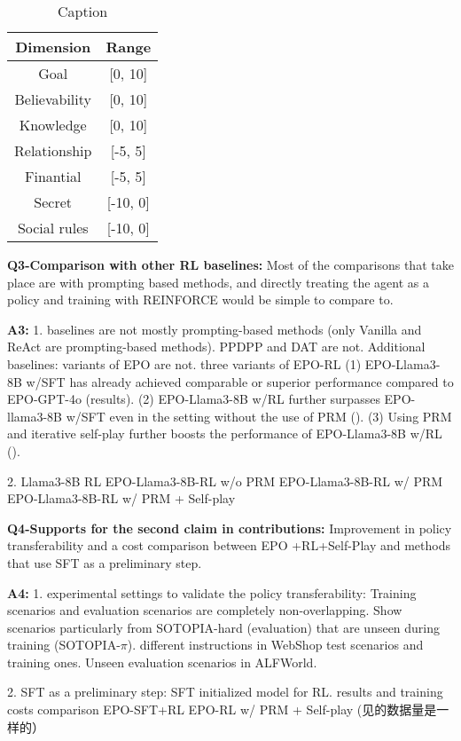 \begin{table*}[h]
    \centering
    \begin{tabular}{c|c}
    \toprule
      Dimension   &  Range \\
      \midrule
      Goal   & [0, 10]\\
      Believability & [0, 10]\\
      Knowledge & [0, 10]\\
      Relationship & [-5, 5] \\
      Finantial & [-5, 5]\\
      Secret & [-10, 0]\\
      Social rules & [-10, 0]\\
      \bottomrule
    \end{tabular}
    \caption{Caption}
    \label{tab:my_label}
\end{table*}



\textbf{Q3-Comparison with other RL baselines:} Most of the comparisons that take place are with prompting based methods, and directly treating the agent as a policy and training with REINFORCE would be simple to compare to.

\textbf{A3:}
1. baselines are not mostly prompting-based methods (only Vanilla and ReAct are prompting-based methods).
PPDPP and DAT are not.
Additional baselines: variants of EPO are not. three variants of EPO-RL
(1) EPO-Llama3-8B w/SFT has already achieved comparable or superior performance compared to EPO-GPT-4o (results). 
(2) EPO-Llama3-8B w/RL further surpasses EPO-llama3-8B w/SFT even in the setting without the use of PRM ().
(3) Using PRM and iterative self-play further boosts the performance of EPO-Llama3-8B w/RL ().

2. Llama3-8B RL 
EPO-Llama3-8B-RL w/o PRM
EPO-Llama3-8B-RL w/ PRM
EPO-Llama3-8B-RL w/ PRM + Self-play


\textbf{Q4-Supports for the second claim in contributions:}  Improvement in policy transferability and a cost comparison between EPO +RL+Self-Play and methods that use SFT as a preliminary step.

\textbf{A4:}
1. experimental settings to validate the policy transferability: Training scenarios and evaluation scenarios are completely non-overlapping. Show scenarios particularly from SOTOPIA-hard (evaluation) that are unseen during training (SOTOPIA-$\pi$).
different instructions in WebShop test scenarios and training ones.
Unseen evaluation scenarios in ALFWorld. 

2.  SFT as a preliminary step: SFT initialized model for RL.
results and training costs comparison
EPO-SFT+RL 
EPO-RL w/ PRM + Self-play (见的数据量是一样的）





